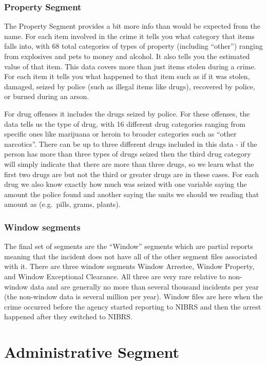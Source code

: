 \documentclass[
]{krantz}
\begin{document}
\subsection{Property Segment}\label{property-segment}

The Property Segment provides a bit more info than would be
expected from the name. For each item involved in the crime
it tells you what category that items falls into, with 68
total categories of types of property (including ``other'')
ranging from explosives and pets to money and alcohol. It
also tells you the estimated value of that item. This data
covers more than just items stolen during a crime. For each
item it tells you what happened to that item such as if it
was stolen, damaged, seized by police (such as illegal items
like drugs), recovered by police, or burned during an arson.

For drug offenses it includes the drugs seized by police.
For these offenses, the data tells us the type of drug, with
16 different drug categories ranging from specific ones like
marijuana or heroin to broader categories such as ``other
narcotics''. There can be up to three different drugs
included in this data - if the person has more than three
types of drugs seized then the third drug category will
simply indicate that there are more than three drugs, so we
learn what the first two drugs are but not the third or
greater drugs are in these cases. For each drug we also know
exactly how much was seized with one variable saying the
amount the police found and another saying the units we
should we reading that amount as (e.g.~pills, grams,
plants).

\subsection{Window segments}\label{window}

The final set of segments are the ``Window'' segments which
are partial reports meaning that the incident does not have
all of the other segment files associated with it. There are
three window segments Window Arrestee, Window Property, and
Window Exceptional Clearance. All three are very rare
relative to non-window data and are generally no more than
several thousand incidents per year (the non-window data is
several million per year). Window files are here when the
crime occurred before the agency started reporting to NIBRS
and then the arrest happened after they switched to NIBRS.

\chapter{Administrative
Segment}\label{administrative-segment-1}
\end{document}
